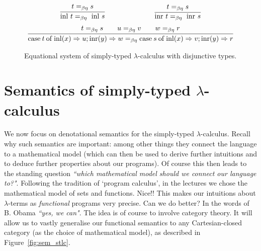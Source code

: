 \documentclass[a4paper, 11pt]{article}
\theoremstyle{definition}
\begin{document}
\begin{figure}
\begin{minipage}{1\textwidth}
        \noindent\dotfill{}
        \begin{align*}
                \infer{
                        \inl\ t =_{\beta \eta}\ \inl\ s
                }{
                        t =_{\beta \eta} s
                }
                \hspace{2.5cm}
                \infer{
                        \inr\ t =_{\beta \eta}\ \inr\ s
                }{
                        t =_{\beta \eta} s
                }
         \end{align*}
         \begin{align*}
                \infer{
                        \mathrm{case} \> t \> \mathrm{of} \>
                        \inl(x) \Rightarrow u;  \inr(y) \Rightarrow w
                        =_{\beta \eta}
                        \mathrm{case} \> s \> \mathrm{of} \>
                        \inl(x) \Rightarrow v;  \inr(y) \Rightarrow r
                }
                {
                       t =_{\beta \eta} s \qquad
                       u =_{\beta \eta} v \qquad
                       w =_{\beta \eta} r 
                }
        \end{align*}
\end{minipage}
\caption{Equational system of simply-typed $\lambda$-calculus with disjunctive types.}
\label{fig:eq_calc_disj}
\end{figure}

\section{Semantics of simply-typed $\lambda$-calculus}

We now focus on denotational semantics for the simply-typed $\lambda$-calculus.
Recall why such semantics are important: among other things they connect the
language to a mathematical model (which can then be used to derive further
intuitions and to deduce further properties about our programs). Of course this
then leads to the standing question \emph{``which mathematical model should we
connect our language to?"}. Following the tradition of `program calculus', in
the lectures we chose the mathematical model of sets and functions. Nice!! This
makes our intuitions about $\lambda$-terms as \emph{functional} programs very
precise. Can we do better? In the words of B. Obama \emph{``yes, we can"}.  The
idea is of course to involve category theory. It will allow us to vastly
generalise our functional semantics to any Cartesian-closed category (as the
choice of mathematical model), as described in Figure~\ref{fig:sem_stlc}.
\end{document}
